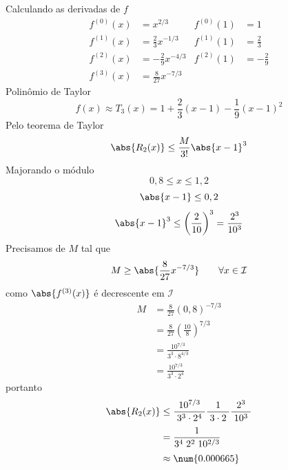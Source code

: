 \begin{exercises}
\begin{exercise}
\begin{answer}
\begin{alphalist}
			\item Calculando as derivadas de $f$
			\begin{align*}
				f^{(0)}(x) & =  x^{2/3}              & f^{(0)}(1) & = 1           \\
				f^{(1)}(x) & = \frac{2}{3}  x^{-1/3} & f^{(1)}(1) & = \frac{2}{3} \\
				f^{(2)}(x) & =-\frac{2}{9}  x^{-4/3} & f^{(2)}(1) & =-\frac{2}{9} \\
				f^{(3)}(x) & = \frac{8}{27} x^{-7/3} &
			\end{align*}
			Polinômio de Taylor
			\[ f(x) \approx T_3(x)
			= 1 + \frac{2}{3} (x-1) -\frac{1}{9}(x-1)^2
			\]
			Pelo teorema de Taylor
			\[ \abs{R_2(x)} \leq \frac{M}{3!}\abs{x-1}^3 \]
			Majorando o módulo
			\[ 0,8 \leq x \leq 1,2 \]
			\[ \abs{x-1}   \leq 0,2 \]
			\[ \abs{x-1}^3 \leq \left(\frac{2}{10}\right)^3 = \frac{2^3}{10^3} \]
			Precisamos de $M$ tal que
			\[ M \geq \abs{\frac{8}{27} x^{-7/3}} \qquad \forall x\in \mathcal{I} \]
			como $\abs{f^{(3)}(x)}$ é decrescente em $\mathcal{I}$
			\begin{align*}
				M & = \frac{8}{27} (0,8)^{-7/3} \\
				& = \frac{8}{27} \left(\frac{10}{8}\right)^{7/3} \\
				& = \frac{10^{7/3}}{3^3\cdot 8^{4/3}} \\
				& = \frac{10^{7/3}}{3^3\cdot 2^4}
			\end{align*}
			portanto
			\begin{align*}
				\abs{R_2(x)} & \leq
				\frac{10^{7/3}}{\;3^3\cdot 2^4\;}
				\frac{1}{\;3\cdot 2\;}
				\frac{2^3}{\;10^3\;}              \\[1mm]
				& = \frac{1}{3^4\; 2^2\; 10^{2/3}}  \\[1mm]
				& \approx \num{0.000665}
			\end{align*}


\end{alphalist}
\end{answer}
\end{exercise}
\end{exercises}
